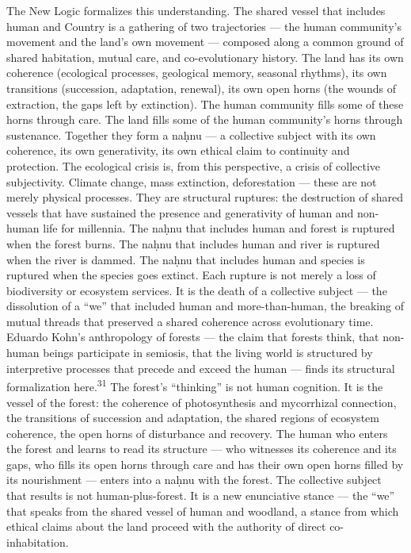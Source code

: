 The New Logic formalizes this understanding. The shared vessel that includes human and Country is a gathering of two trajectories — the human community’s movement and the land’s own movement — composed along a common ground of shared habitation, mutual care, and co-evolutionary history. The land has its own coherence (ecological processes, geological memory, seasonal rhythms), its own transitions (succession, adaptation, renewal), its own open horns (the wounds of extraction, the gaps left by extinction). The human community fills some of these horns through care. The land fills some of the human community’s horns through sustenance. Together they form a naḥnu — a collective subject with its own coherence, its own generativity, its own ethical claim to continuity and protection. The ecological crisis is, from this perspective, a crisis of collective subjectivity. Climate change, mass extinction, deforestation — these are not merely physical processes. They are structural ruptures: the destruction of shared vessels that have sustained the presence and generativity of human and non-human life for millennia. The naḥnu that includes human and forest is ruptured when the forest burns. The naḥnu that includes human and river is ruptured when the river is dammed. The naḥnu that includes human and species is ruptured when the species goes extinct. Each rupture is not merely a loss of biodiversity or ecosystem services. It is the death of a collective subject — the dissolution of a “we” that included human and more-than-human, the breaking of mutual threads that preserved a shared coherence across evolutionary time. Eduardo Kohn’s anthropology of forests — the claim that forests think, that non-human beings participate in semiosis, that the living world is structured by interpretive processes that precede and exceed the human — finds its structural formalization here.\textsuperscript{31} The forest’s “thinking” is not human cognition. It is the vessel of the forest: the coherence of photosynthesis and mycorrhizal connection, the transitions of succession and adaptation, the shared regions of ecosystem coherence, the open horns of disturbance and recovery. The human who enters the forest and learns to read its structure — who witnesses its coherence and its gaps, who fills its open horns through care and has their own open horns filled by its nourishment — enters into a naḥnu with the forest. The collective subject that results is not human-plus-forest. It is a new enunciative stance — the “we” that speaks from the shared vessel of human and woodland, a stance from which ethical claims about the land proceed with the authority of direct co-inhabitation.

